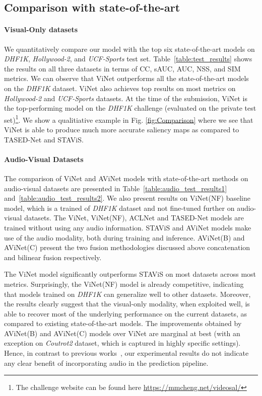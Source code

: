 \documentclass[letterpaper, 10 pt, conference]{ieeeconf}  \usepackage{times}
\begin{document}
\subsection{Comparison with state-of-the-art}

\paragraph{Visual-Only datasets}
We quantitatively compare our model with the top six state-of-the-art models on \emph{DHF1K}, \emph{Hollywood-2}, and \emph{UCF-Sports} test set. Table~\ref{table:test_results} shows the results on all three datasets in terms of CC, sAUC, AUC, NSS, and SIM metrics. We can observe that ViNet outperforms all the state-of-the-art models on the \emph{DHF1K} dataset. ViNet also achieves top results on most metrics on \emph{Hollywood-2} and \emph{UCF-Sports} datasets. At the time of the submission, ViNet is the top-performing model on the \emph{DHF1K} challenge (evaluated on the private test set)\footnote{The challenge website can be found here \url{https://mmcheng.net/videosal/}}. We show a qualitiative example in Fig. \ref{fig:Comparison} where we see that ViNet is able to produce much more accurate saliency maps as compared to TASED-Net and STAViS.


\paragraph{Audio-Visual Datasets}

The comparison of ViNet and AViNet models with state-of-the-art methods on audio-visual datasets are presented in Table~\ref{table:audio_test_results1} and~\ref{table:audio_test_results2}. We also present results on ViNet(NF) baseline model, which is a trained of \emph{DHF1K} dataset and not fine-tuned further on audio-visual datasets. The ViNet, ViNet(NF), ACLNet and TASED-Net models are trained without using any audio information. STAViS and AViNet models make use of the audio modality, both during training and inference.  AViNet(B) and AViNet(C) present the two fusion methodologies discussed above \ie  concatenation and bilinear fusion respectively. 

The ViNet model significantly outperforms STAViS on most datasets across most metrics. Surprisingly, the ViNet(NF) model is already competitive, indicating that models trained on \emph{DHF1K} can generalize well to other datasets. Moreover, the results clearly suggest that the visual-only modality, when exploited well, is able to recover most of the underlying performance on the current datasets, as compared to existing state-of-the-art models. The improvements obtained by AViNet(B) and AViNet(C) models over ViNet are marginal at best (with an exception on \emph{Coutrot2} dataset, which is captured in highly specific settings). Hence, in contrast to previous works~\cite{tsiami2020stavis,tavakoli2019dave}, our experimental results do not indicate any clear benefit of incorporating audio in the prediction pipeline. 
\end{document}
